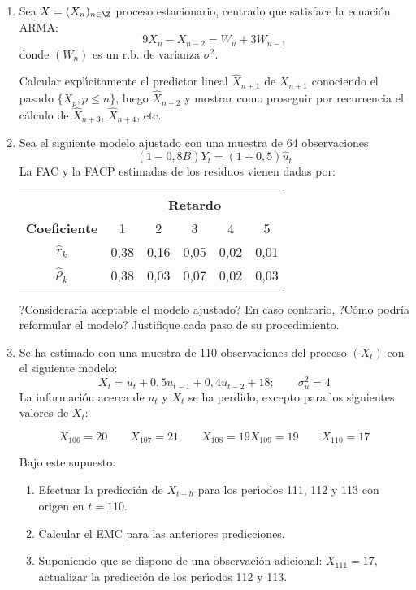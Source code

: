 \begin{enumerate}
 \item Sea $X=(X_{n} )_{n\in \Z} $ proceso estacionario, centrado que satisface la ecuaci\'{o}n ARMA:
\[
9X_{n} -X_{n-2} =W_{n} +3W_{n-1} 
\]
donde $(W_{n})$ es un r.b. de varianza $\sigma^{2}$.

Calcular expl\'{\i}citamente el predictor lineal $\widehat{X}_{n+1} 
$ de $X_{n+1} $ conociendo el pasado $\{ {X_{p} ,p\le n} \}$, 
luego $\widehat{X}_{n+2} $ y mostrar como proseguir por recurrencia 
el c\'{a}lculo de $\widehat{X}_{n+3}$, $\widehat{X}_{n+4} $, 
etc.


\item Sea el siguiente modelo ajustado con una muestra de 64 observaciones
\[
(1-0,8B)Y_{t} =(1+0,5){\widehat{u}_{t} } 
\]
La FAC y la FACP estimadas de los residuos vienen dadas por:

\begin{center}
\begin{tabular}{@{}cccccc@{}}
\toprule
&\multicolumn{5}{c}{\textbf{Retardo}} \\
\cmidrule{2-6}
\textbf{Coeficiente} & 1& 2& 3& 4& 5 \\
\midrule
$\widehat{r}_{k} $ & 0,38& 0,16& 0,05& 0,02& 0,01 \\
$\widehat{\rho}_{k} $ & 0,38& 0,03& 0,07& 0,02& 0,03 \\
\bottomrule
\end{tabular}
\end{center}

?Considerar\'{i}a aceptable el modelo ajustado? En caso contrario, 
?C\'{o}mo podr\'{i}a reformular el modelo? Justifique cada paso de su 
procedimiento. 

\item Se ha estimado con una muestra de 110 observaciones del proceso $(X_{t} )$ con el siguiente modelo:
\[
X_{t} =u_{t} +0,5u_{t-1} +0,4u_{t-2} +18;\qquad\sigma_{u}^{2} =4
\]
La informaci\'{o}n acerca de $u_{t}$ y $ X_{t}$ 
se ha perdido, excepto para los siguientes valores de $X_{t}$:

\[
X_{{106}}=20\qquad X_{{107}}=21\qquad X_{108}=19 X_{109}=19\qquad X_{{110}}=17
\]

Bajo este supuesto:
\begin{enumerate}
\item Efectuar la predicci\'{o}n de $X_{t+h} $ para los per\'{\i}odos 111, 112 y 113 con origen en $t = 110$.
\item Calcular el EMC para las anteriores predicciones.
\item Suponiendo que se dispone de una observaci\'{o}n adicional: $X_{111}=17$, actualizar la predicci\'{o}n de los per\'{\i}odos 112 y 113.
\end{enumerate}


\end{enumerate}

